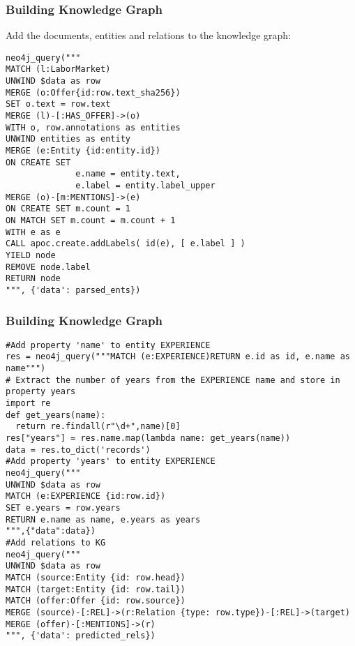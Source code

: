 \begin{frame}[fragile]\frametitle{Building Knowledge Graph}

Add the documents, entities and relations to the knowledge graph:
 
\begin{lstlisting}
neo4j_query("""
MATCH (l:LaborMarket)
UNWIND $data as row
MERGE (o:Offer{id:row.text_sha256})
SET o.text = row.text
MERGE (l)-[:HAS_OFFER]->(o)
WITH o, row.annotations as entities
UNWIND entities as entity
MERGE (e:Entity {id:entity.id})
ON CREATE SET 
              e.name = entity.text,
              e.label = entity.label_upper
MERGE (o)-[m:MENTIONS]->(e)
ON CREATE SET m.count = 1
ON MATCH SET m.count = m.count + 1
WITH e as e
CALL apoc.create.addLabels( id(e), [ e.label ] )
YIELD node
REMOVE node.label
RETURN node
""", {'data': parsed_ents})
\end{lstlisting}
	 
\end{frame}

\begin{frame}[fragile]\frametitle{Building Knowledge Graph}


\begin{lstlisting}
#Add property 'name' to entity EXPERIENCE
res = neo4j_query("""MATCH (e:EXPERIENCE)RETURN e.id as id, e.name as name""")
# Extract the number of years from the EXPERIENCE name and store in property years
import re
def get_years(name):
  return re.findall(r"\d+",name)[0]
res["years"] = res.name.map(lambda name: get_years(name))
data = res.to_dict('records')
#Add property 'years' to entity EXPERIENCE
neo4j_query("""
UNWIND $data as row
MATCH (e:EXPERIENCE {id:row.id})
SET e.years = row.years
RETURN e.name as name, e.years as years
""",{"data":data})
#Add relations to KG
neo4j_query("""
UNWIND $data as row
MATCH (source:Entity {id: row.head})
MATCH (target:Entity {id: row.tail})
MATCH (offer:Offer {id: row.source})
MERGE (source)-[:REL]->(r:Relation {type: row.type})-[:REL]->(target)
MERGE (offer)-[:MENTIONS]->(r)
""", {'data': predicted_rels})	 
\end{lstlisting}

\end{frame}

